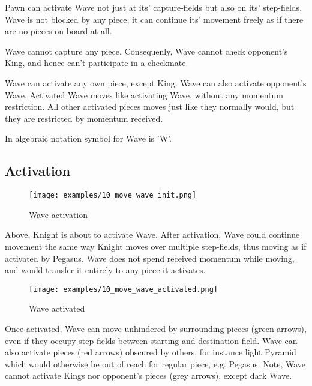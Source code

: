 Pawn can activate Wave not just at its' capture-fields but also on its'
step-fields. Wave is not blocked by any piece, it can continue its'
movement freely as if there are no pieces on board at all.

Wave cannot capture any piece. Consequenly, Wave cannot check opponent's
King, and hence can't participate in a checkmate.

Wave can activate any own piece, except King. Wave can also activate
opponent's Wave. Activated Wave moves like activating Wave, without any
momentum restriction. All other activated pieces moves just like they
normally would, but they are restricted by momentum received.

In algebraic notation symbol for Wave is 'W'.

\clearpage %

\subsection*{Activation}

\noindent
\begin{figure}[h]
\texttt{[image: examples/10\_move\_wave\_init.png]}
\caption{Wave activation}
\label{fig:10_move_wave_init}
\end{figure}

Above, Knight is about to activate Wave. After activation, Wave could
continue movement the same way Knight moves over multiple step-fields,
thus moving as if activated by Pegasus. Wave does not spend received
momentum while moving, and would transfer it entirely to any piece it
activates.

\clearpage %

\noindent
\begin{figure}[h]
\texttt{[image: examples/10\_move\_wave\_activated.png]}
\caption{Wave activated}
\label{fig:10_move_wave_activated}
\end{figure}

Once activated, Wave can move unhindered by surrounding pieces (green arrows),
even if they occupy step-fields between starting and destination field. Wave
can also activate pieces (red arrows) obscured by others, for instance light
Pyramid which would otherwise be out of reach for regular piece, e.g. Pegasus.
Note, Wave cannot activate Kings nor opponent's pieces (grey arrows), except
dark Wave.

